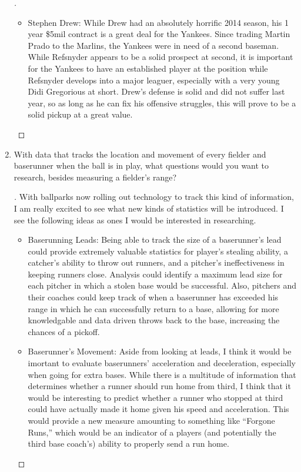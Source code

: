 \documentclass[]{article}
\theoremstyle{definition}
\begin{document}
\begin{enumerate}
\begin{proof}[\unskip\nopunct]
\begin{itemize}
		\item Stephen Drew: While Drew had an absolutely horrific 2014 season, his 1 year \$5mil contract is a great deal for the Yankees. Since trading Martin Prado to the Marlins, the Yankees were in need of a second baseman. While Refsnyder appears to be a solid prospect at second, it is important for the Yankees to have an established player at the position while Refsnyder develops into a major leaguer, especially with a very young Didi Gregorious at short. Drew's defense is solid and did not suffer last year, so as long as he can fix his offensive struggles, this will prove to be a solid pickup at a great value.
	\end{itemize}	
\end{proof}

\item With data that tracks the location and movement of every fielder and baserunner when the ball is in play, what questions would you want to research, besides measuring a fielder’s range?

\begin{proof}[\unskip\nopunct]\renewcommand{\qedsymbol}{}
With ballparks now rolling out technology to track this kind of information, I am really excited to see what new kinds of statistics will be introduced. I see the following ideas as ones I would be interested in researching.

	\begin{itemize}
		\item Baserunning Leads: Being able to track the size of a baserunner's lead could provide extremely valuable statistics for player's stealing ability, a catcher's ability to throw out runners, and a pitcher's ineffectiveness in keeping runners close. Analysis could identify a maximum lead size for each pitcher in which a stolen base would be successful. Also, pitchers and their coaches could keep track of when a baserunner has exceeded his range in which he can successfully return to a base, allowing for more knowledgable and data driven throws back to the base, increasing the chances of a pickoff. 

		\item Baserunner's Movement: Aside from looking at leads, I think it would be imortant to evaluate baserunners' acceleration and deceleration, especially when going for extra bases. While there is a multitude of information that determines whether a runner should run home from third, I think that it would be interesting to predict whether a runner who stopped at third could have actually made it home given his speed and acceleration. This would provide a new measure amounting to something like ``Forgone Runs,'' which would be an indicator of a players (and potentially the third base coach's) ability to properly send a run home. 


\end{itemize}
\end{proof}
\end{enumerate}
\end{document}
